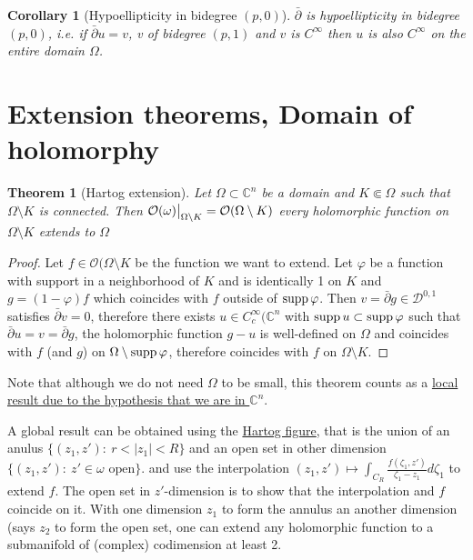 \documentclass[11pt]{article}
\newtheorem{theorem}{Theorem}
\newtheorem{corollary}{Corollary}[theorem]
\newcommand{\supp}{\mathop{\rm supp}\nolimits}
\newcommand\restr[2]{{%
\left.\kern-\nulldelimiterspace %
#1 %
\vphantom{\big|} %
\right|_{#2} %
}}
\begin{document}
\begin{corollary}[Hypoellipticity in bidegree \((p,0)\)]
\(\bar \partial\) is hypoellipticity in bidegree \((p,0)\), i.e. if \(\bar \partial u
= v\), v of bidegree \((p,1)\) and \(v\) is \(C^\infty\) then \(u\) is also \(C^\infty\) on the entire domain \(\Omega\).
\end{corollary}


\section{Extension theorems, Domain of holomorphy}
\label{sec:orgcc4db45}

\begin{theorem}[Hartog extension]
\label{thm:hartog-ext}
Let \(\Omega \subset \mathbb{C}^n\) be a domain and \(K \Subset \Omega\) such that \(\Omega\setminus K\) is connected. Then \(\restr{\mathcal{O}(\omega)}{\Omega\setminus K} =
\mathcal{O}(\Omega\setminus K)\) every holomorphic function on \(\Omega\setminus K\) extends to \(\Omega\)
\end{theorem}
\begin{proof}
Let \(f\in \mathcal{O}(\Omega \setminus K\) be the function we want to extend. Let \(\varphi\) be a function with support in a neighborhood of \(K\) and is identically 1 on
\(K\) and \(g = (1-\varphi)f\) which coincides with \(f\) outside of \(\supp
\varphi\). Then \(v = \bar \partial g \in \mathcal{D}^{0,1}\) satisfies \(\bar
\partial v = 0\), therefore there exists \(u\in C_c^\infty(\mathbb{C}^n\) with \(\supp
u \subset \supp \varphi\) such that \(\bar \partial u = v = \bar \partial g\), the
holomorphic function \(g-u\) is well-defined on \(\Omega\) and coincides with \(f\)
(and \(g\)) on \(\Omega\setminus \supp\varphi\), therefore coincides with \(f\) on
\(\Omega\setminus K\).
\end{proof}

Note that although we do not need \(\Omega\) to be small, this theorem counts as a
\uline{local result due to the hypothesis that we are in \(\mathbb{C}^n\)}.


A global result can be obtained using the \href{https://en.wikipedia.org/wiki/Hartogs'\_extension\_theorem}{Hartog figure}, that is the union of an anulus \(\{ (z_1,z'):\ r < |z_1| <
R\}\) and an open set in other dimension \(\{ (z_1,z'):\ z'\in\omega \text{ open}\}\).
and use the interpolation \((z_1,z') \mapsto \int_{C_{R}} \frac{f(\zeta_1,z')}{\zeta_1-z_1}d\zeta_1\) to extend \(f\). The open set in \(z'\)-dimension is to show that the interpolation and \(f\)
coincide on it. With one dimension \(z_1\) to form the annulus an another dimension (says
\(z_2\) to form the open set, one can extend any holomorphic function to a submanifold
of (complex) codimension at least 2.
\end{document}

